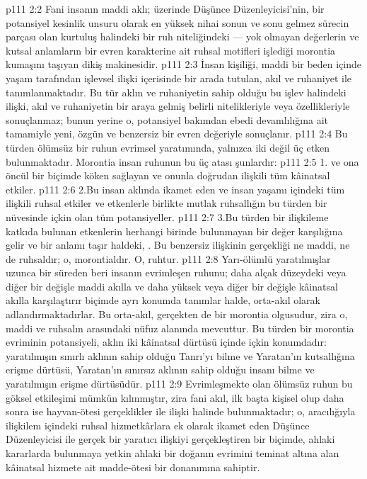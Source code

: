 \vs p111 2:2 Fani insanın maddi aklı; üzerinde Düşünce Düzenleyicisi’nin, bir potansiyel kesinlik unsuru olarak en yüksek nihai sonun ve sonu gelmez sürecin parçası olan kurtuluş halindeki bir ruh niteliğindeki --- yok olmayan değerlerin ve kutsal anlamların bir evren karakterine ait ruhsal motifleri işlediği morontia kumaşını taşıyan dikiş makinesidir.
\vs p111 2:3 İnsan kişiliği, maddi bir beden içinde yaşam tarafından işlevsel ilişki içerisinde bir arada tutulan, akıl ve ruhaniyet ile tanımlanmaktadır. Bu tür aklın ve ruhaniyetin sahip olduğu bu işlev halindeki ilişki, akıl ve ruhaniyetin bir araya gelmiş belirli nitelikleriyle veya özellikleriyle sonuçlanmaz; bunun yerine o,  potansiyel bakımdan ebedi devamlılığına ait tamamiyle yeni, özgün ve benzersiz bir evren değeriyle sonuçlanır.
\vs p111 2:4 Bu türden ölümsüz bir ruhun evrimsel yaratımında, yalnızca iki değil üç etken bulunmaktadır. Morontia insan ruhunun bu üç atası şunlardır:
\vs p111 2:5 1.\bibnobreakspace {} ve ona öncül bir biçimde köken sağlayan ve onunla doğrudan ilişkili tüm kâinatsal etkiler.
\vs p111 2:6 2.\bibnobreakspace Bu insan aklında ikamet eden  ve insan yaşamı içindeki tüm ilişkili ruhsal etkiler ve etkenlerle birlikte mutlak ruhsallığın bu türden bir nüvesinde içkin olan tüm potansiyeller.
\vs p111 2:7 3.\bibnobreakspace Bu türden bir ilişkileme katkıda bulunan etkenlerin herhangi birinde bulunmayan bir değer karşılığına gelir ve bir anlamı taşır haldeki, . Bu benzersiz ilişkinin gerçekliği ne maddi, ne de ruhsaldır; o, morontialdır. O, ruhtur.
\vs p111 2:8 Yarı\hyp{}ölümlü yaratılmışlar uzunca bir süreden beri insanın evrimleşen ruhunu; daha alçak düzeydeki veya diğer bir değişle maddi akılla ve daha yüksek veya diğer bir değişle kâinatsal akılla karşılaştırır biçimde ayrı konumda tanımlar halde, orta\hyp{}akıl olarak adlandırmaktadırlar. Bu orta\hyp{}akıl, gerçekten de bir morontia olgusudur, zira o, maddi ve ruhsalın arasındaki nüfuz alanında mevcuttur. Bu türden bir morontia evriminin potansiyeli, aklın iki kâinatsal dürtüsü içinde içkin konumdadır: yaratılmışın sınırlı aklının sahip olduğu Tanrı’yı bilme ve Yaratan’ın kutsallığına erişme dürtüsü, Yaratan’ın sınırsız aklının sahip olduğu insanı bilme ve yaratılmışın  erişme dürtüsüdür.
\vs p111 2:9 Evrimleşmekte olan ölümsüz ruhun bu göksel etkileşimi mümkün kılınmıştır, zira fani akıl, ilk başta kişisel olup daha sonra ise hayvan\hyp{}ötesi gerçeklikler ile ilişki halinde bulunmaktadır; o, aracılığıyla ilişkilem içindeki ruhsal hizmetkârlara ek olarak ikamet eden Düşünce Düzenleyicisi ile gerçek bir yaratıcı ilişkiyi gerçekleştiren bir biçimde, ahlaki kararlarda bulunmaya yetkin ahlaki bir doğanın evrimini teminat altına alan kâinatsal hizmete ait madde\hyp{}ötesi bir donanımına sahiptir.
